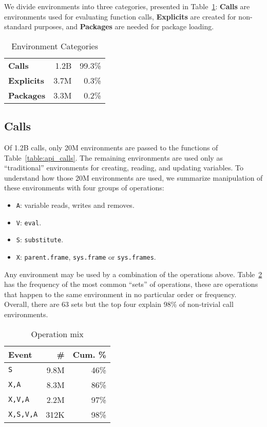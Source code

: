 \documentclass[10pt,sigplan,authorversion=true]{acmart}
\renewcommand{\c}[1]{\lstinline |#1|\xspace}
\newcommand{\eval}{\c{eval}}
\newcommand{\substitute}{\c{substitute}}
\begin{document}
We divide environments into three categories, presented in
Table~\ref{table:env_category}: \textbf{Calls} are environments used for
evaluating function calls, \textbf{Explicits} are created for non-standard
purposes, and \textbf{Packages} are needed for package loading.

\begin{table}[!h] \small
  \caption{Environment Categories} \label{table:env_category}\centering
  \begin{tabular}{lrr}\toprule
     \textbf{Calls}&     1.2B& 99.3\%\\
    \textbf{Explicits}& 3.7M& 0.3\%\\
    \textbf{Packages}&  3.3M& 0.2\%\\\bottomrule
  \end{tabular}
\end{table}


\subsection{Calls}

Of 1.2B calls, only 20M environments are passed to the functions of
Table~\ref{table:api_calls}. The remaining environments are used only as
``traditional'' environments for creating, reading, and updating variables. To
understand how those 20M environments are used, we summarize manipulation
of these environments with four groups of operations:

\begin{itemize}
\item \texttt{A}: variable reads, writes and removes.
\item \texttt{V}: \eval.
\item \texttt{S}: \substitute.
\item \texttt{X}: \c{parent.frame}, \c{sys.frame} or \c{sys.frames}.
\end{itemize}

\noindent
Any environment may be used by a combination of the operations above.
Table~\ref{table:call_env_seq} has the frequency of the most common ``sets'' of
operations, these are operations that happen to the same environment in no
particular order or frequency. Overall, there are 63 sets but the top four
explain 98\% of non-trivial call environments.

\begin{table}[!h]  \small
  \caption{Operation mix} \label{table:call_env_seq}  \centering
  \begin{tabular}{lrr}    \toprule
    \textbf{Event}&\textbf{\#}&\textbf{Cum. \%}\\\midrule
    \texttt{S}&          9.8M & 46\%\\
    \texttt{X,A}&        8.3M & 86\%\\
    \texttt{X,V,A}&      2.2M & 97\%\\
    \texttt{X,S,V,A}   & 312K & 98\%\\\bottomrule
  \end{tabular}
\end{table}
\end{document}
